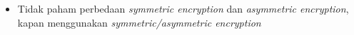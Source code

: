\documentclass{article}
\begin{document}

\begin{itemize}
    \item Tidak paham perbedaan \textit{symmetric encryption} dan \textit{asymmetric encryption}, kapan menggunakan \textit{symmetric/asymmetric encryption}
\end{itemize}
\end{document}
